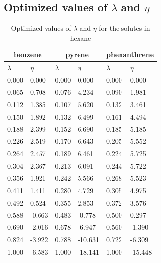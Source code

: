 \documentclass[
	12pt,				%
	openright,			%
	oneside,			%
	a4paper,			%
	english,			%
	brazil				%
	]{abntex2}
\begin{document}
\begin{apendicesenv}

\partapendices

\chapter{Optimized values of $\lambda$ and $\eta$}
\begin{table}[h]
	\centering
	\caption{Optimized values of $\lambda$ and $\eta$ for the solutes in hexane}
	\begin{tabular}{llllll}
		\hline
        \multicolumn{2}{c}{benzene}& \multicolumn{2}{c}{pyrene}& \multicolumn{2}{c}{phenanthrene}\\
		\hline
		$\lambda$ & $\eta$ & $\lambda$ & $\eta$  & $\lambda$ & $\eta$   \\ 
		\hline
0.000	&	0.000	&	0.000	&	0.000	&	0.000	&	0.000	\\
0.065	&	0.708	&	0.076	&	4.234	&	0.090	&	1.981	\\
0.112	&	1.385	&	0.107	&	5.620	&	0.132	&	3.461	\\
0.150	&	1.892	&	0.132	&	6.499	&	0.161	&	4.494	\\
0.188	&	2.399	&	0.152	&	6.690	&	0.185	&	5.185	\\
0.226	&	2.519	&	0.170	&	6.643	&	0.205	&	5.552	\\
0.264	&	2.457	&	0.189	&	6.461	&	0.224	&	5.725	\\
0.304	&	2.367	&	0.213	&	6.091	&	0.244	&	5.722	\\
0.356	&	1.921	&	0.242	&	5.566	&	0.268	&	5.523	\\
0.411	&	1.411	&	0.280	&	4.729	&	0.305	&	4.975	\\
0.492	&	0.524	&	0.355	&	2.853	&	0.372	&	3.576	\\
0.588	&	-0.663	&	0.483	&	-0.778	&	0.500	&	0.297	\\
0.690	&	-2.016	&	0.678	&	-6.947	&	0.560	&	-1.390	\\
0.824	&	-3.922	&	0.788	&	-10.631	&	0.722	&	-6.309	\\
1.000	&	-6.583	&	1.000	&	-18.141	&	1.000	&	-15.448	\\

		\hline
	\end{tabular}
\end{table}


\end{apendicesenv}
\end{document}
